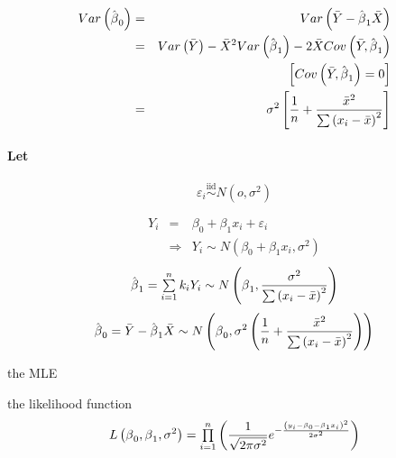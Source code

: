 \documentclass{article}
\begin{document}
\bigskip

\begin{eqnarray*}
Var\left( \hat{\beta}_{0}\right) &=&Var\left( \bar{Y}-\hat{\beta}_{1}\bar{X}%
\right) \\
&=&Var\left( \bar{Y}\right) -\bar{X}^{2}Var\left( \hat{\beta}_{1}\right) -2%
\bar{X}Cov\left( \bar{Y},\hat{\beta}_{1}\right) \\
&&\left[ Cov\left( \bar{Y},\hat{\beta}_{1}\right) =0\right] \\
&=&\sigma ^{2}\left[ \frac{1}{n}+\frac{\bar{x}^{2}}{\tsum \left( x_{i}-\bar{x%
}\right) ^{2}}\right]
\end{eqnarray*}

\bigskip

\paragraph{Let}

\begin{equation*}
\varepsilon _{i}\overset{\text{iid}}{\sim }N\left( o,\sigma ^{2}\right)
\end{equation*}

\begin{eqnarray*}
Y_{i} &=&\beta _{0}+\beta _{1}x_{i}+\varepsilon _{i} \\
&\Rightarrow &Y_{i}\sim N\left( \beta _{0}+\beta _{1}x_{i},\sigma ^{2}\right)
\end{eqnarray*}%
\begin{equation*}
\hat{\beta}_{1}=\tsum\limits_{i=1}^{n}k_{i}Y_{i}\sim N\left( \beta _{1},%
\frac{\sigma ^{2}}{\tsum \left( x_{i}-\bar{x}\right) ^{2}}\right)
\end{equation*}%
\begin{equation*}
\hat{\beta}_{0}=\bar{Y}-\hat{\beta}_{1}\bar{X}\sim N\left( \beta _{0},\sigma
^{2}\left( \frac{1}{n}+\frac{\bar{x}^{2}}{\tsum \left( x_{i}-\bar{x}\right)
^{2}}\right) \right)
\end{equation*}

\bigskip

the MLE

the likelihood function%
\begin{equation*}
L\left( \beta _{0},\beta _{1},\sigma ^{2}\right)
=\tprod\limits_{i=1}^{n}\left( \frac{1}{\sqrt{2\pi \sigma ^{2}}}e^{-\frac{%
\left( y_{i}-\beta _{0}-\beta _{1}x_{i}\right) ^{2}}{2\sigma ^{2}}}\right)
\end{equation*}

\bigskip
\end{document}
